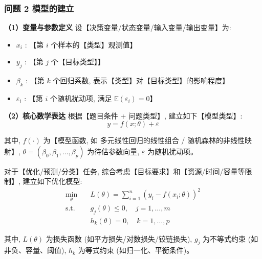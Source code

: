 
\subsubsection{问题 2 模型的建立}

\textbf{（1）变量与参数定义} \quad 设【决策变量/状态变量/输入变量/输出变量】为:
\begin{itemize}
  \item $x_i$ : 【第 $i$ 个样本的【类型】观测值】
  \item $y_j$ : 【第 $j$ 个【目标类型】】
  \item $\beta_k$ : 【第 $k$ 个回归系数, 表示【类型】对【目标类型】的影响程度】
  \item $\varepsilon_i$ : 【第 $i$ 个随机扰动项, 满足 $\mathbb{E}(\varepsilon_i)=0$】
\end{itemize}

\textbf{（2）核心数学表达} \quad 根据【题目条件 + 问题类型】, 建立如下【模型类型】:
\begin{equation}
  y = f(x; \theta) + \varepsilon
  \label{eq:model_q2}
\end{equation}

其中, $f(\cdot)$ 为【模型函数, 如 多元线性回归的线性组合 / 随机森林的非线性映射】, $\theta = (\beta_0, \beta_1, \ldots, \beta_p)$ 为待估参数向量, $\varepsilon$ 为随机扰动项。

对于【优化/预测/分类】任务, 综合考虑【目标要求】和【资源/时间/容量等限制】, 建立如下优化模型:
\begin{align}
  \min_{\theta} \quad & L(\theta) = \sum_{i=1}^{n} (y_i - f(x_i; \theta))^2 \\
  \text{s.t.} \quad & g_j(\theta) \leq 0, \quad j=1,\ldots,m \\
  & h_k(\theta) = 0, \quad k=1,\ldots,p \label{eq:constraints_q2}
\end{align}

其中, $L(\theta)$ 为损失函数 (如平方损失/对数损失/铰链损失), $g_j$ 为不等式约束 (如非负、容量、阈值), $h_k$ 为等式约束 (如归一化、平衡条件)。


